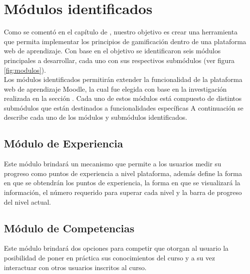 
\section{Módulos identificados}
\label{analisis:modulos}

 Como se comentó en el capítulo de , nuestro
 objetivo es crear una herramienta que permita implementar los principios de
 gamificación dentro de una plataforma web de aprendizaje. Con base en el objetivo
 se identificaron seis módulos principales a desarrollar, cada uno con sus
 respectivos submódulos (ver figura \ref{fig:modulos}).\\

 \noindent
 Los módulos identificados permitirán extender la funcionalidad de la plataforma web
 de aprendizaje Moodle, la cual fue elegida con base en la investigación realizada en
 la sección . Cada uno de estos módulos está
 compuesto de distintos submódulos que están destinados a funcionalidades específicas
 A continuación se describe cada uno de los módulos y submódulos identificados.






\subsection*{Módulo de Experiencia}

 \noindent
 Este módulo brindará un mecanismo que permite a los usuarios medir su progreso
 como puntos de experiencia a nivel plataforma, además define la forma en que se
 obtendrán los puntos de experiencia, la forma en que se visualizará la información,
 el número requerido para superar cada nivel y la barra de progreso del nivel
 actual.

\subsection*{Módulo de Competencias}

 \noindent 
 Este módulo brindará dos opciones para competir que otorgan al usuario
 la posibilidad de poner en práctica sus conocimientos del curso y a su vez
 interactuar con otros usuarios inscritos al curso.

